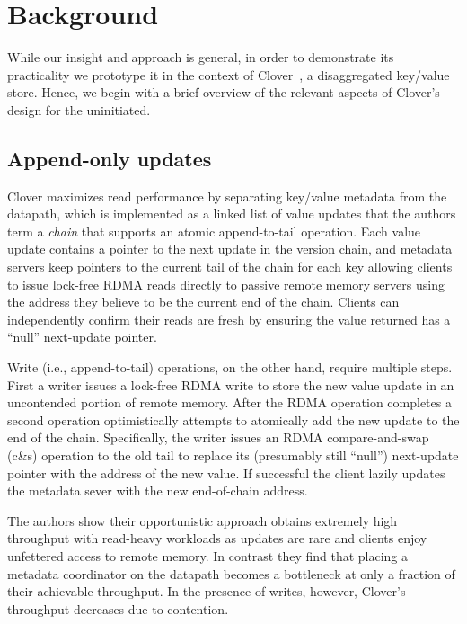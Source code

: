 \section{Background}

While our insight and approach is general, in order to demonstrate its
practicality we prototype it in the context of Clover~\cite{clover}, a
disaggregated key/value store.  Hence, we begin with a brief overview
of the relevant aspects of Clover's design for the uninitiated.

\subsection{Append-only updates}

Clover maximizes read performance by separating key/value metadata
from the datapath, which is implemented as a linked list of value
updates that the authors term a \emph{chain} that supports an atomic
append-to-tail operation.  Each value update contains a pointer to the
next update in the version chain, and metadata servers keep pointers
to the current tail of the chain for each key allowing clients to
issue lock-free RDMA reads directly to passive remote memory servers
using the address they believe to be the current end of the chain.
Clients can independently confirm their reads are fresh by ensuring the
value returned has a ``null'' next-update pointer.

Write (i.e., append-to-tail) operations, on the other hand, require
multiple steps.  First a writer issues a lock-free RDMA write to store
the new value update in an uncontended portion of remote
memory. After the RDMA operation completes a second operation
optimistically attempts to atomically add the new update to the end of
the chain.  Specifically, the writer issues an RDMA compare-and-swap
(c\&s) operation to the old tail to replace its (presumably still
``null'') next-update pointer with the address of the new value.  If
successful the client lazily updates the metadata sever with the
new end-of-chain address.


The authors show their opportunistic approach obtains extremely high
throughput with read-heavy workloads as updates are rare and clients
enjoy unfettered access to remote memory. In contrast they find that
placing a metadata coordinator on the datapath becomes a bottleneck at
only a fraction of their achievable throughput.  In the presence of
writes, however, Clover's throughput decreases due to contention.

